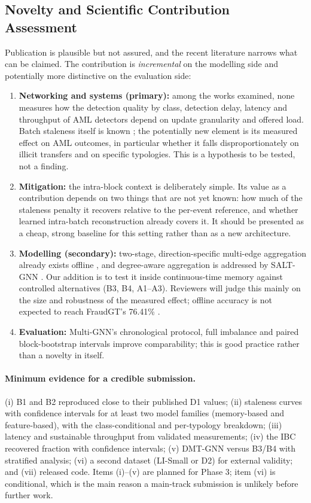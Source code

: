 \documentclass[11pt,a4paper]{article}
\begin{document}
\subsection{Novelty and Scientific Contribution Assessment}
Publication is plausible but not assured, and the recent literature narrows what can be claimed. The contribution is \emph{incremental} on the modelling side and potentially more distinctive on the evaluation side:
\begin{enumerate}[leftmargin=*]
    \item \textbf{Networking and systems (primary):} among the works examined, none measures how the detection quality by class, detection delay, latency and throughput of AML detectors depend on update granularity and offered load. Batch staleness itself is known \cite{su2024pres,zhou2025badgnn,anchorrm2026,streamtgn2026}; the potentially new element is its measured effect on AML outcomes, in particular whether it falls disproportionately on illicit transfers and on specific typologies. This is a hypothesis to be tested, not a finding.
    \item \textbf{Mitigation:} the intra-block context is deliberately simple. Its value as a contribution depends on two things that are not yet known: how much of the staleness penalty it recovers relative to the per-event reference, and whether learned intra-batch reconstruction \cite{anchorrm2026} already covers it. It should be presented as a cheap, strong baseline for this setting rather than as a new architecture.
    \item \textbf{Modelling (secondary):} two-stage, direction-specific multi-edge aggregation already exists offline \cite{bilgi2026mega,ding2024diam,egressy2024multigraph}, and degree-aware aggregation is addressed by SALT-GNN \cite{losavio2026saltgnn}. Our addition is to test it inside continuous-time memory against controlled alternatives (B3, B4, A1--A3). Reviewers will judge this mainly on the size and robustness of the measured effect; offline accuracy is not expected to reach FraudGT's 76.41\% \cite{lin2024fraudgt}.
    \item \textbf{Evaluation:} Multi-GNN's chronological protocol, full imbalance and paired block-bootstrap intervals improve comparability; this is good practice rather than a novelty in itself.
\end{enumerate}

\paragraph{Minimum evidence for a credible submission.} (i) B1 and B2 reproduced close to their published D1 values; (ii) staleness curves with confidence intervals for at least two model families (memory-based and feature-based), with the class-conditional and per-typology breakdown; (iii) latency and sustainable throughput from validated measurements; (iv) the IBC recovered fraction with confidence intervals; (v) DMT-GNN versus B3/B4 with stratified analysis; (vi) a second dataset (LI-Small or D2) for external validity; and (vii) released code. Items (i)--(v) are planned for Phase 3; item (vi) is conditional, which is the main reason a main-track submission is unlikely before further work.
\end{document}
